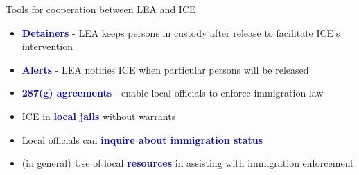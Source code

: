 \documentclass[xcolor=pdftex,dvipsnames,table,handout]{beamer}
\begin{document}

\begin{frame}{Tools for cooperation between LEA and ICE}
\pause
\begin{itemize}
\item \textbf{\textcolor{Blue}{Detainers}} - LEA keeps persons in custody after release to facilitate ICE's intervention\vspace{0.10cm}\pause
\item \textbf{\textcolor{Blue}{Alerts}} - LEA notifies ICE when particular persons will be released\vspace{0.10cm}\pause
\item \textbf{\textcolor{Blue}{287(g) agreements}} - enable local officials to enforce immigration law\vspace{0.10cm}\pause
\item ICE in \textbf{\textcolor{Blue}{local jails}} without warrants\vspace{0.10cm}\pause
\item Local officials can \textbf{\textcolor{Blue}{inquire about immigration status}}\vspace{0.10cm}\pause
\item (in general) Use of local \textbf{\textcolor{Blue}{resources}} in assisting with immigration enforcement\vspace{0.10cm}
\end{itemize}
\end{frame}
\end{document}
